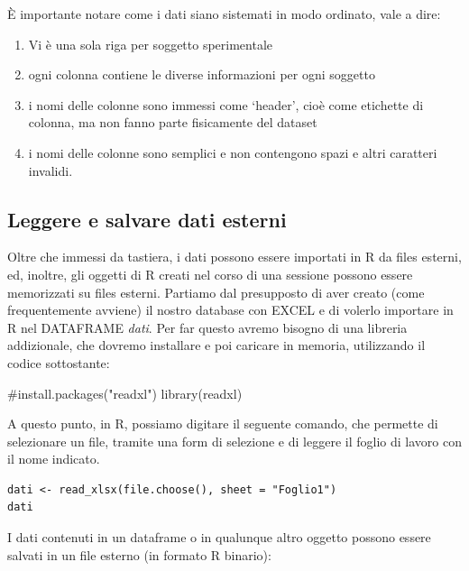 \documentclass[a4paper,12pt,oneside]{book}
\providecommand{\tightlist}{%
  \setlength{\itemsep}{0pt}\setlength{\parskip}{0pt}}
\newenvironment{Shaded}{\begin{snugshade}}{\end{snugshade}}
\newcommand{\CommentTok}[1]{#1}
\newcommand{\FunctionTok}[1]{#1}
\newcommand{\NormalTok}[1]{#1}
\begin{document}
È importante notare come i dati siano sistemati in modo ordinato, vale a dire:

\begin{enumerate}
\def\labelenumi{\arabic{enumi}.}
\tightlist
\item
  Vi è una sola riga per soggetto sperimentale
\item
  ogni colonna contiene le diverse informazioni per ogni soggetto
\item
  i nomi delle colonne sono immessi come `header', cioè come etichette di colonna, ma non fanno parte fisicamente del dataset
\item
  i nomi delle colonne sono semplici e non contengono spazi e altri caratteri invalidi.
\end{enumerate}

\hypertarget{leggere-e-salvare-dati-esterni}{%
\subsection*{Leggere e salvare dati esterni}\label{leggere-e-salvare-dati-esterni}}

Oltre che immessi da tastiera, i dati possono essere importati in R da files esterni, ed, inoltre, gli oggetti di R creati nel corso di una sessione possono essere memorizzati su files esterni. Partiamo dal presupposto di aver creato (come frequentemente avviene) il nostro database con EXCEL e di volerlo importare in R nel DATAFRAME \emph{dati}. Per far questo avremo bisogno di una libreria addizionale, che dovremo installare e poi caricare in memoria, utilizzando il codice sottostante:

\begin{Shaded}
\begin{Highlighting}[]
\CommentTok{\#install.packages("readxl")}
\FunctionTok{library}\NormalTok{(readxl)}
\end{Highlighting}
\end{Shaded}

A questo punto, in R, possiamo digitare il seguente comando, che permette di selezionare un file, tramite una form di selezione e di leggere il foglio di lavoro con il nome indicato.

\begin{verbatim}
dati <- read_xlsx(file.choose(), sheet = "Foglio1")
dati
\end{verbatim}

I dati contenuti in un dataframe o in qualunque altro oggetto possono essere salvati in un file esterno (in formato R binario):
\end{document}
